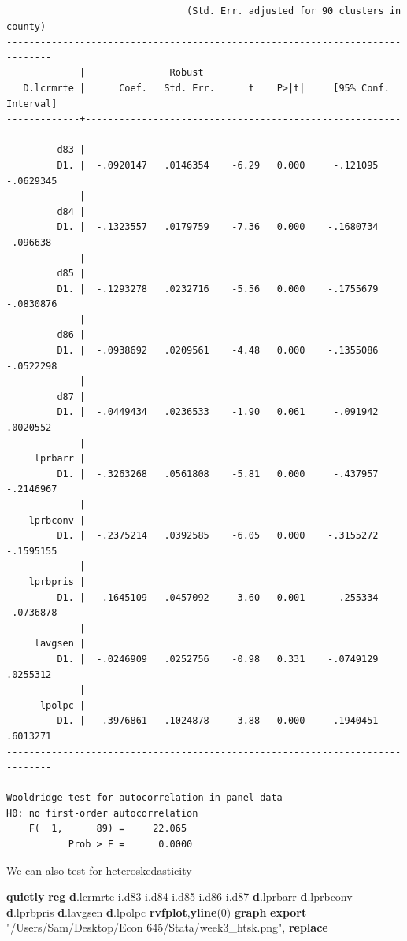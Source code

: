 \documentclass[
]{book}
\newenvironment{Shaded}{\begin{snugshade}}{\end{snugshade}}
\newcommand{\KeywordTok}[1]{\textcolor[rgb]{0.13,0.29,0.53}{\textbf{#1}}}
\newcommand{\NormalTok}[1]{#1}
\newcommand{\StringTok}[1]{\textcolor[rgb]{0.31,0.60,0.02}{#1}}
\begin{document}
\begin{verbatim}
                                (Std. Err. adjusted for 90 clusters in county)
------------------------------------------------------------------------------
             |               Robust
   D.lcrmrte |      Coef.   Std. Err.      t    P>|t|     [95% Conf. Interval]
-------------+----------------------------------------------------------------
         d83 |
         D1. |  -.0920147   .0146354    -6.29   0.000     -.121095   -.0629345
             |
         d84 |
         D1. |  -.1323557   .0179759    -7.36   0.000    -.1680734    -.096638
             |
         d85 |
         D1. |  -.1293278   .0232716    -5.56   0.000    -.1755679   -.0830876
             |
         d86 |
         D1. |  -.0938692   .0209561    -4.48   0.000    -.1355086   -.0522298
             |
         d87 |
         D1. |  -.0449434   .0236533    -1.90   0.061     -.091942    .0020552
             |
     lprbarr |
         D1. |  -.3263268   .0561808    -5.81   0.000     -.437957   -.2146967
             |
    lprbconv |
         D1. |  -.2375214   .0392585    -6.05   0.000    -.3155272   -.1595155
             |
    lprbpris |
         D1. |  -.1645109   .0457092    -3.60   0.001     -.255334   -.0736878
             |
     lavgsen |
         D1. |  -.0246909   .0252756    -0.98   0.331    -.0749129    .0255312
             |
      lpolpc |
         D1. |   .3976861   .1024878     3.88   0.000     .1940451    .6013271
------------------------------------------------------------------------------

Wooldridge test for autocorrelation in panel data
H0: no first-order autocorrelation
    F(  1,      89) =     22.065
           Prob > F =      0.0000
\end{verbatim}

We can also test for heteroskedasticity

\begin{Shaded}
\begin{Highlighting}[]
\KeywordTok{quietly} \KeywordTok{reg} \KeywordTok{d}\NormalTok{.lcrmrte i.d83 i.d84 i.d85 i.d86 i.d87 }\KeywordTok{d}\NormalTok{.lprbarr }\KeywordTok{d}\NormalTok{.lprbconv }\KeywordTok{d}\NormalTok{.lprbpris }\KeywordTok{d}\NormalTok{.lavgsen }\KeywordTok{d}\NormalTok{.lpolpc}
\KeywordTok{rvfplot}\NormalTok{,}\KeywordTok{yline}\NormalTok{(0)}
\KeywordTok{graph} \KeywordTok{export} \StringTok{"/Users/Sam/Desktop/Econ 645/Stata/week3\_htsk.png"}\NormalTok{, }\KeywordTok{replace}
\end{Highlighting}
\end{Shaded}
\end{document}
